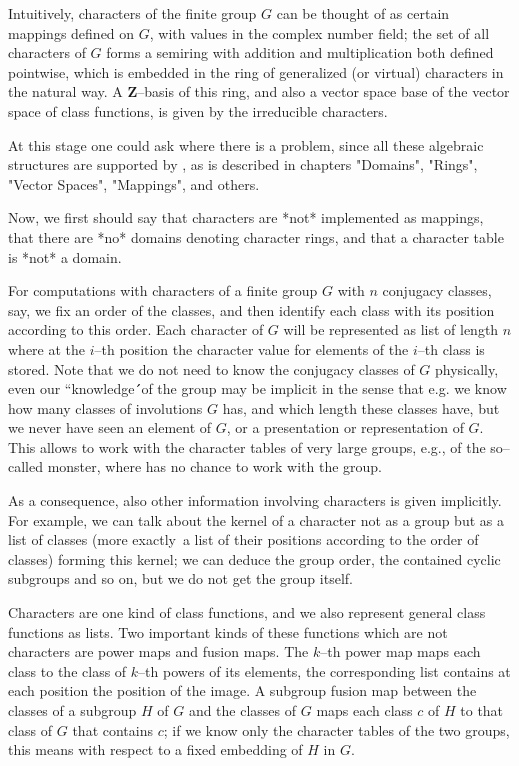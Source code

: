 Intuitively, characters of  the  finite  group  $G$ can be  thought of as
certain mappings defined on $G$, with values in the complex number field;
the set of  all characters  of $G$  forms  a semiring  with addition  and
multiplication  both defined pointwise, which is embedded in the ring  of
generalized (or virtual) characters in the natural way.  A {\bf Z}--basis
of this ring, and also  a vector space  base of the vector space of class
functions, is given by the irreducible characters.

At this stage  one  could ask where there  is a problem,  since all these
algebraic structures are supported by {\GAP}, as is described in chapters
"Domains", "Rings", "Vector Spaces", "Mappings", and others.

Now,  we  first  should  say  that  characters are  *not*  implemented as
mappings, that there are *no* {\GAP}  domains  denoting character  rings,
and that a character table is *not* a domain.

For computations with characters of a finite group $G$ with $n$ conjugacy
classes,  say,  we  fix an order of the classes, and  then identify  each
class with its position according to  this order.  Each character of  $G$
will be  represented as list of length $n$ where at  the $i$--th position
the  character value  for elements of the $i$--th  class is stored.  Note
that we do not need to know the conjugacy classes of $G$ physically, even
our ``knowledge\'\'\ of the group may be  implicit in the sense that e.g.
we  know how  many classes of involutions $G$ has, and which length these
classes have, but we never have seen an element of $G$, or a presentation
or representation  of $G$.  This allows to work with the character tables
of very large  groups, e.g., of the so--called monster,  where {\GAP} has
no chance to work with the group.

As a consequence,  also other information involving  characters is  given
implicitly.  For example, we can talk about the kernel of a character not
as a  group but as a list of classes  (more  exactly\:\  a list  of their
positions according to  the order of classes) forming this kernel; we can
deduce the  group order, the contained cyclic subgroups and so on, but we
do not get the group itself.

Characters are one kind of class functions, and we also represent general
class functions as lists.  Two important  kinds of these functions  which
are not characters are power maps and fusion maps.  The $k$--th power map
maps  each  class to the class  of $k$--th  powers  of its elements,  the
corresponding list  contains at each position the position of the  image.
A subgroup fusion  map  between the classes  of a subgroup $H$ of $G$ and
the classes of $G$ maps each class $c$ of $H$  to that class of $G$  that
contains $c$;  if  we  know only  the character tables of the two groups,
this means with respect to a fixed embedding of $H$ in $G$.

